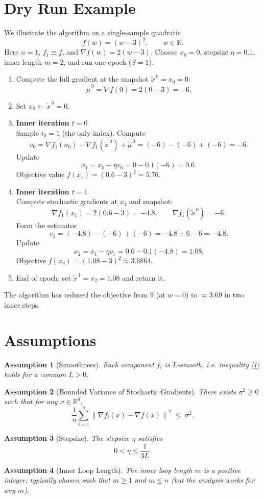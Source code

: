 \documentclass{article}
\newtheorem{assumption}{Assumption}
\newcommand{\RR}{\mathbb{R}}
\newcommand{\norm}[1]{\left\|#1\right\|}
\newcommand{\grad}{\nabla}
\begin{document}
\section*{Dry Run Example}
We illustrate the algorithm on a single‑sample quadratic
\[
f(w)= (w-3)^{2},\qquad w\in\RR.
\]
Here $n=1$, $f_1\equiv f$, and $\grad f(w)=2(w-3)$.  
Choose $x_0=0$, stepsize $\eta=0.1$, inner length $m=2$, and run one epoch ($S=1$).

\begin{enumerate}[label=Step \arabic*:, leftmargin=*]
\item Compute the full gradient at the snapshot $\tilde{x}^{\,0}=x_0=0$:
\[
\tilde{\mu}^{\,0}= \grad f(0)=2(0-3)=-6.
\]
\item Set $x_0\gets\tilde{x}^{\,0}=0$.
\item \textbf{Inner iteration $t=0$}\\
Sample $i_0=1$ (the only index). Compute
\[
v_0 = \grad f_{1}(x_0)-\grad f_{1}(\tilde{x}^{\,0})+\tilde{\mu}^{\,0}
      = (-6)-(-6)+(-6) = -6.
\]
Update
\[
x_{1}=x_0-\eta v_0 = 0 -0.1(-6)=0.6.
\]
Objective value $f(x_{1})=(0.6-3)^2=5.76$.
\item \textbf{Inner iteration $t=1$}\\
Compute stochastic gradients at $x_{1}$ and snapshot:
\[
\grad f_{1}(x_{1}) = 2(0.6-3) = -4.8,\qquad
\grad f_{1}(\tilde{x}^{\,0}) = -6.
\]
Form the estimator
\[
v_1 = (-4.8)-(-6)+(-6)= -4.8+6-6 = -4.8.
\]
Update
\[
x_{2}=x_{1}-\eta v_1 = 0.6-0.1(-4.8)=1.08.
\]
Objective $f(x_{2})=(1.08-3)^2\approx3.6864$.
\item End of epoch: set $\tilde{x}^{\,1}=x_{2}=1.08$ and return it.
\end{enumerate}
The algorithm has reduced the objective from $9$ (at $w=0$) to $\approx3.69$ in two inner steps.

\newpage
\section*{Assumptions}
\begin{assumption}[Smoothness]\label{ass:smooth}
Each component $f_i$ is $L$‑smooth, i.e. inequality \eqref{1} holds for a common $L>0$.
\end{assumption}
\begin{assumption}[Bounded Variance of Stochastic Gradients]\label{ass:var}
There exists $\sigma^{2}\ge0$ such that for any $x\in\RR^{d}$,
\[
\frac{1}{n}\sum_{i=1}^{n}\norm{\grad f_i(x)-\grad f(x)}^{2}\;\le\;\sigma^{2}. 
\tag{5}
\]
\end{assumption}
\begin{assumption}[Stepsize]\label{ass:stepsize}
The stepsize $\eta$ satisfies
\[
0<\eta\le\frac{1}{3L}. 
\tag{6}
\]
\end{assumption}
\begin{assumption}[Inner Loop Length]\label{ass:inner}
The inner loop length $m$ is a positive integer, typically chosen such that $m\ge 1$ and $m\le n$ (but the analysis works for any $m$).
\end{assumption}
\end{document}
